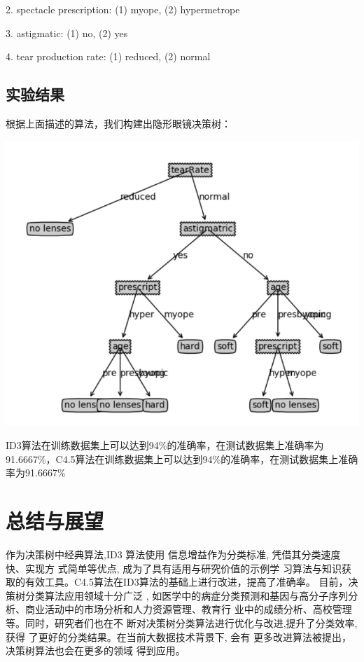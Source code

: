 \documentclass[11pt,a4paper]{article}
\begin{document}
    2. spectacle prescription:  (1) myope, (2) hypermetrope
    
    3. astigmatic:     (1) no, (2) yes
    
    4. tear production rate:  (1) reduced, (2) normal
    

\subsection{实验结果}

根据上面描述的算法，我们构建出隐形眼镜决策树：

\includegraphics[scale=0.5]{abc.png}

ID3算法在训练数据集上可以达到94\%的准确率，在测试数据集上准确率为91.6667\%，C4.5算法在训练数据集上可以达到94\%的准确率，在测试数据集上准确率为91.6667\%


\section{总结与展望}

作为决策树中经典算法,ID3 算法使用
信息增益作为分类标准, 凭借其分类速度快、实现方
式简单等优点, 成为了具有适用与研究价值的示例学
习算法与知识获取的有效工具。C4.5算法在ID3算法的基础上进行改进，提高了准确率。
目前，决策树分类算法应用领域十分广泛
, 如医学中的病症分类预测和基因与高分子序列分
析、商业活动中的市场分析和人力资源管理、教育行
业中的成绩分析、高校管理等。同时，研究者们也在不
断对决策树分类算法进行优化与改进,提升了分类效率,获得
了更好的分类结果。在当前大数据技术背景下, 会有
更多改进算法被提出，决策树算法也会在更多的领域
得到应用。
\end{document}

